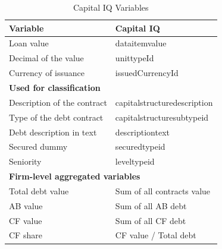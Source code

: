 \documentclass[12pt]{article}
\begin{document}
\newpage

\begin{table}[htbp]
\centering
\caption{Capital IQ Variables}
\label{tab:capital_iq_variables}
\begin{tabular}{ll}
\toprule
Variable & Capital IQ \\
\midrule
Loan value & dataitemvalue \\
Decimal of the value & unittypeId \\
Currency of issuance & issuedCurrencyId \vspace{3mm} \\
\multicolumn{2}{l}{\textbf{Used for classification}} \\
Description of the contract & capitalstructuredescription \\
Type of the debt contract & capitalstructuresubtypeid \\
Debt description in text & descriptiontext \\
Secured dummy & securedtypeid \\
Seniority & leveltypeid \vspace{3mm} \\
\multicolumn{2}{l}{\textbf{Firm-level aggregated variables}} \\
Total debt value & Sum of all contracts value \\
AB value & Sum of all AB debt \\
CF value & Sum of all CF debt \\
CF share & CF value / Total debt \\
\bottomrule
\end{tabular}
\end{table}
\end{document}
